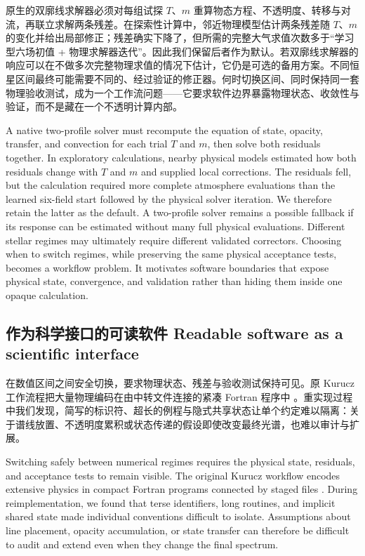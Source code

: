 原生的双廓线求解器必须对每组试探 $T$、$m$ 重算物态方程、不透明度、转移与对流，再联立求解两条残差。在探索性计算中，邻近物理模型估计两条残差随 $T$、$m$ 的变化并给出局部修正；残差确实下降了，但所需的完整大气求值次数多于“学习型六场初值 + 物理求解器迭代”。因此我们保留后者作为默认。若双廓线求解器的响应可以在不做多次完整物理求值的情况下估计，它仍是可选的备用方案。不同恒星区间最终可能需要不同的、经过验证的修正器。何时切换区间、同时保持同一套物理验收测试，成为一个工作流问题——它要求软件边界暴露物理状态、收敛性与验证，而不是藏在一个不透明计算内部。

\begin{EN}
A native two-profile solver must recompute the equation of state, opacity,
transfer, and convection for each trial $T$ and $m$, then solve both residuals
together. In exploratory calculations, nearby physical models estimated how
both residuals change with $T$ and $m$ and supplied local corrections. The
residuals fell, but the calculation required more complete atmosphere
evaluations than the learned six-field start followed by the physical solver iteration.
We therefore retain the latter as the default. A two-profile solver remains a
possible fallback if its response can be estimated without many full physical
evaluations. Different stellar regimes may ultimately require different
validated correctors. Choosing when to switch regimes, while preserving the
same physical acceptance tests, becomes a workflow problem. It motivates
software boundaries that expose physical state, convergence, and validation
rather than hiding them inside one opaque calculation.
\end{EN}

\subsection{作为科学接口的可读软件 Readable software as a scientific interface}

在数值区间之间安全切换，要求物理状态、残差与验收测试保持可见。原 Kurucz 工作流程把大量物理编码在由中转文件连接的紧凑 Fortran 程序中 \citep{Kurucz2005}。重实现过程中我们发现，简写的标识符、超长的例程与隐式共享状态让单个约定难以隔离：关于谱线放置、不透明度累积或状态传递的假设即使改变最终光谱，也难以审计与扩展。

\begin{EN}
Switching safely between numerical regimes requires the physical state,
residuals, and acceptance tests to remain visible. The original Kurucz workflow
encodes extensive physics in compact Fortran programs connected by staged files
\citep{Kurucz2005}. During reimplementation, we found that terse
identifiers, long routines, and implicit shared state made individual
conventions difficult to isolate. Assumptions about line placement, opacity
accumulation, or state transfer can therefore be difficult to audit and extend
even when they change the final spectrum.
\end{EN}

